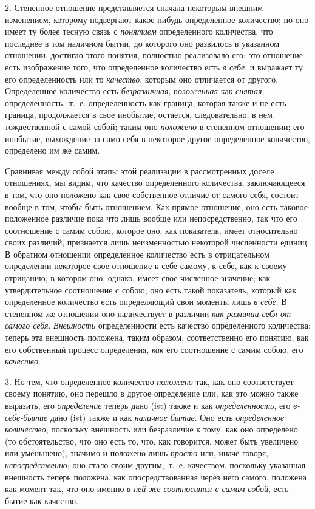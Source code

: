2. Степенное отношение представляется сначала некоторым внешним изменением,
которому подвергают какое-нибудь определенное количество; но оно имеет ту
более тесную связь с {\em понятием} определенного
количества, что последнее в том наличном бытии, до которого оно развилось в
указанном отношении, достигло этого понятия, полностью реализовало его; это
отношение есть изображение того, что определенное количество есть
{\em в себе}, и выражает ту его определенность или то
{\em качество}, которым оно отличается от другого.
Определенное количество есть {\em безразличная},
{\em положенная} как {\em снятая},
определенность,~т.~е. определенность как граница, которая также и не есть
граница, продолжается в свое инобытие, остается, следовательно, в нем
тождественной с самой собой; таким оно {\em положено} в
степенном отношении; его инобытие, выхождение за само себя в некоторое
другое определенное количество, определено им же самим.

Сравнивая между собой этапы этой реализации в рассмотренных доселе
отношениях, мы видим, что качество определенного количества, заключающееся
в том, что оно положено как свое собственное отличие от самого себя,
состоит вообще в том, чтобы быть отношением. Как прямое отношение, оно есть
таковое положенное различие пока что лишь вообще или непосредственно, так
что его соотношение с самим собою, которое оно, как показатель, имеет
относительно своих различий, признается лишь неизменностью некоторой
численности единиц. В обратном отношении определенное количество есть в
отрицательном определении некоторое свое отношение к себе самому, к себе,
как к своему отрицанию, в котором оно, однако, имеет свое численное
значение; как утвердительное соотношение с собою, оно есть такой
показатель, который как определенное количество есть определяющий свои
моменты лишь {\em в себе}. В степенном же отношении оно
наличествует в различии {\em как различии себя от
самого себя}. {\em Внешность} определенности есть
качество определенного количества: теперь эта внешность положена, таким
образом, соответственно его понятию, как его собственный процесс
определения, {\em как} его соотношение с самим собою,
его {\em качество}.

3. Но тем, что определенное количество {\em положено}
так, как оно соответствует своему понятию, оно перешло в другое определение
или, как это можно также выразить, его
{\em определение} теперь дано (ist) также и как
{\em определенность}, его
{\em в-себе-бытие} дано (ist) также и как
{\em наличное бытие}. Оно есть
{\em определенное количество}, поскольку внешность или
безразличие к тому, как оно определено (то обстоятельство, что оно есть то,
что, как говорится, может быть увеличено или уменьшено), значимо и положено
лишь {\em просто} или, иначе говоря,
{\em непосредственно}; оно стало своим другим,~т.~е.
качеством, поскольку указанная внешность теперь положена, как
опосредствованная через него самого, положена как момент так, что оно
именно {\em в ней же соотносится с самим собой}, есть
бытие как качество.

